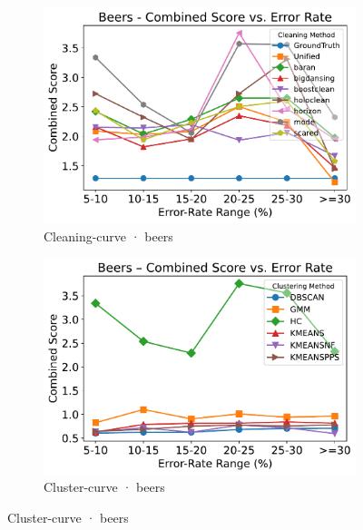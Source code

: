 \documentclass[10pt]{article} %
\numberwithin{equation}{section}
\begin{document}
\begin{figure}[htbp]
  \centering
  \footnotesize
  \setlength{\abovecaptionskip}{4pt}
  \setlength{\belowcaptionskip}{0pt}

  \begin{subfigure}{0.35\linewidth}
    \centering
    \includegraphics[width=\linewidth]{figures/5.3.2graph/beers_combined_score_cleaning.pdf}
    \caption{Cleaning-curve · beers}
  \end{subfigure}\hfill
  \begin{subfigure}{0.35\linewidth}
    \centering
    \includegraphics[width=\linewidth]{figures/5.3.2graph/beers_combined_score_cluster.pdf}
    \caption{Cluster-curve · beers}

\end{subfigure}
\end{figure}
\end{document}
